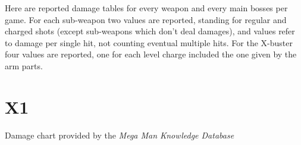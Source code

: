 Here are reported damage tables for every weapon and every main bosses per game. For each sub-weapon two values are reported, standing for regular and charged shots (except sub-weapons which don't deal damages), and values refer to damage per single hit, not counting eventual multiple hits. For the X-buster four values are reported, one for each level charge included the one given by the arm parts.
\section{X1}
Damage chart provided by the \emph{Mega Man Knowledge Database}~\cite{wiki:damage_chart_X1}

\begin{table}[htp]
\end{table}
